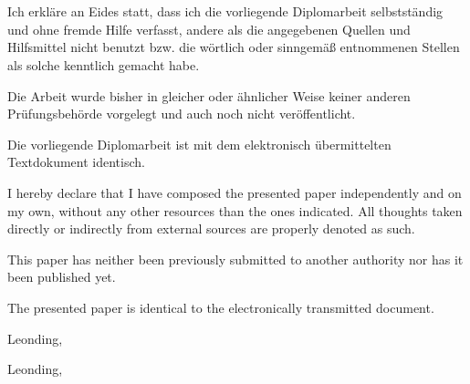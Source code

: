 \thispagestyle{empty}
\vspace{3cm}
~ \\ \\
{
Ich erkläre an Eides statt, dass ich die vorliegende Diplomarbeit selbstständig und ohne fremde Hilfe verfasst, andere als die angegebenen Quellen und Hilfsmittel nicht benutzt bzw. die wörtlich oder sinngemäß entnommenen Stellen als solche kenntlich gemacht habe.

Die Arbeit wurde bisher in gleicher oder ähnlicher Weise keiner anderen Prüfungsbehörde vorgelegt und auch noch nicht veröffentlicht.

Die vorliegende Diplomarbeit ist mit dem elektronisch übermittelten Textdokument identisch.
}
{
I hereby declare that I have composed the presented paper independently and on my own, without any other resources than the ones indicated. 
All thoughts taken directly or indirectly from external sources are properly denoted as such.

This paper has neither been previously submitted to another authority nor has it been published yet.

The presented paper is identical to the electronically transmitted document.
}
\vspace{3cm}
\begin{tabbing}
Leonding,  \hspace{5cm}{\firstauthor} %
\end{tabbing}
\vspace{3cm}
\begin{tabbing}
Leonding,  \hspace{5cm} {\secondauthor} %
\end{tabbing}
\vspace{10cm}
\newpage
\setcounter{page}{1}

